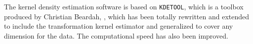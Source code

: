 The kernel density estimation software is 
based on  {\tt KDETOOL}, which is a \ML{} toolbox produced by
Christian Beardah, \cite{BeardahBaxter1996},
which has been 
 totally rewritten and extended
to include the transformation kernel estimator and generalized to cover
any dimension for the data. The computational speed has also been improved.



